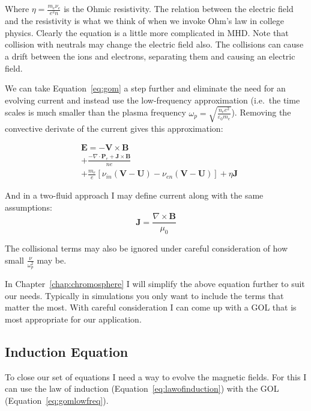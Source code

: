 \documentclass[12pt,upcase]{umlthesis}
\begin{document}
Where $\eta = \frac{m_e \nu_e}{e^2 n}$ is the Ohmic resistivity. The relation between the electric field and the resistivity is what we think of when we invoke Ohm's law in college physics. Clearly the equation is a little more complicated in MHD\@. Note that collision with neutrals may change the electric field also. The collisions can cause a drift between the ions and electrons, separating them and causing an electric field.

We can take Equation~\ref{eq:gom} a step further and eliminate the need for an evolving current and instead use the low-frequency approximation (i.e.\ the time scales is much smaller than the plasma frequency $\omega_p = \sqrt{\frac{n_e e^2}{\varepsilon_0 m_e}}$). Removing the convective derivate of the current gives this approximation:

\begin{equation}\label{eq:gomlowfreq}
\begin{aligned}
	&\textbf{E}  = - \textbf{V}\times\textbf{B} \\
	&+ \frac{-\nabla\cdot\textbf{P}_e + \textbf{J}\times\textbf{B}}{ne} \\
	&  + \frac{m_e}{e}[\nu_{in} (\textbf{V}-\textbf{U}) - \nu_{en}(\textbf{V} - \textbf{U})] + \eta\textbf{J}
\end{aligned}
\end{equation}

And in a two-fluid approach I may define current along with the same assumptions:
\begin{equation}
	\textbf{J} = \frac{\nabla\times\textbf{B}}{\mu_0}
\end{equation}

The collisional terms may also be ignored under careful consideration of how small $\frac{\nu}{\omega^2_p}$ may be.

In Chapter~\ref{chap:chromosphere} I will simplify the above equation further to suit our needs. Typically in simulations you only want to include the terms that matter the most. With careful consideration I can come up with a GOL that is most appropriate for our application.

\subsection{Induction Equation}

To close our set of equations I need a way to evolve the magnetic fields. For this I can use the law of induction (Equation~\ref{eq:lawofinduction}) with the GOL (Equation~\ref{eq:gomlowfreq}).
\end{document}
